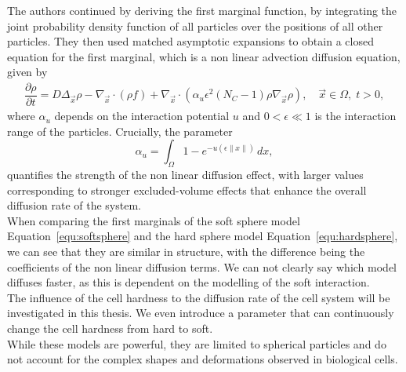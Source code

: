 The authors continued by deriving the first marginal function, by integrating the joint probability density function of all particles over the positions of all other particles. 
They then used matched asymptotic expansions to obtain a closed equation for the first marginal, which is a non linear advection diffusion equation, given by
\begin{align}
	\dfrac{\partial \rho}{\partial t} = D \Delta_{\vec{x}} \rho - \nabla_{\vec{x}} \cdot (\rho f)  + \nabla_{\vec{x}} \cdot (\alpha_u \epsilon^2(N_C-1)\rho \nabla_{\vec{x}} \rho), \quad \vec{x} \in \Omega, \; t >0, 
	\label{equ:softsphere}
\end{align}
where $\alpha_u$ depends on the interaction potential $u$ and $0 < \epsilon \ll 1$ is the interaction range of the particles.
Crucially, the parameter 
\[
	\alpha_u = \int_{\Omega} 1 - e^{-u(\epsilon \|x\|)} \, dx, 
\]
quantifies the strength of the non linear diffusion effect, with larger values corresponding to stronger excluded-volume effects that enhance the overall diffusion rate of the system. \\
When comparing the first marginals of the soft sphere model Equation~\eqref{equ:softsphere} and the hard sphere model Equation~\eqref{equ:hardsphere}, we can see that they are similar in structure, with the difference being the coefficients of the non linear diffusion terms. 
We can not clearly say which model diffuses faster, as this is dependent on the modelling of the soft interaction. \\
The influence of the cell hardness to the diffusion rate of the cell system will be investigated in this thesis. 
We even introduce a parameter that can continuously change the cell hardness from hard to soft. \\
While these models are powerful, they are limited to spherical particles and do not account for the complex shapes and deformations observed in biological cells.  \\



